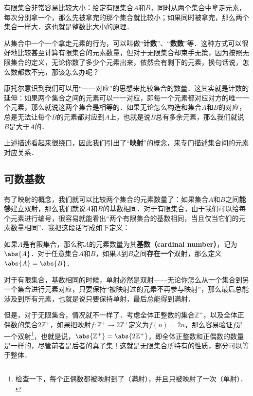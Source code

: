 有限集合非常容易比较大小：给定有限集合$A$和$B$，同时从两个集合中拿走元素，每次分别拿一个，那么先被拿完的那个集合就比较小；如果同时被拿完，那么两个集合一样大．这也就是整数比大小的原理．

从集合中一个一个拿走元素的行为，可以叫做“\textbf{计数}”、“\textbf{数数}”等．这种方式可以很好地比较甚至计算有限集合的元素数量，但对于无限集合却束手无策，因为按照无限集合的定义，无论你数了多少个元素出来，依然会有剩下的元素，换句话说，怎么数都数不完，那该怎么办呢？

康托尔意识到我们可以用“一一对应”的思想来比较集合的数量．这其实就是计数的延伸：如果两个集合之间的元素可以一一对应，即每一个元素都对应对方的唯一一个元素，那么就说这两个集合是相等的．如果无论怎么构造和集合$A$和$B$的对应，总是无法让每个$B$的元素都对应到$A$上，也就是说$B$总有多余元素，那么我们就说$B$是大于$A$的．

上述描述看起来很绕口，因此我们引出了“\textbf{映射}”的概念，来专门描述集合间的元素对应关系．



\subsection{可数基数}


有了映射的概念，我们就可以比较两个集合的元素数量了：如果集合$A$和$B$之间\textbf{能够}建立双射，那么我们就说$A$和$B$的基数相同．对于有限集合，由于我们可以给每个元素进行编号，很容易就能看出“两个有限集合的基数相同，当且仅当它们的元素数量相同”．我把这段话写成如下定义：

\begin{definition}{}
如果$A$是有限集合，那么称$A$的元素数量为其\textbf{基数（cardinal number）}，记为$\abs{A}$．对于任意集合$A$和$B$，如果$A$到$B$之间\textbf{存在一个}双射，那么定义$\abs{A}=\abs{B}$．
\end{definition}


对于有限集合，基数相同的时候，单射必然是双射——无论你怎么从一个集合到另一个集合进行元素对应，只要保持“被映射过的元素不再参与映射”，那么最后总能涉及到所有元素，也就是说只要保持单射，最后总能得到满射．

但是，对于无限集合，情况就不一样了．考虑全体正整数的集合$\mathbb{Z}^+$，以及全体正偶数的集合$2\mathbb{Z}^+$，如果把映射$f:\mathbb{Z}^+\rightarrow2\mathbb{Z}^+$定义为$f(n)=2n$，那么容易验证$f$是一个双射\footnote{检查一下，每个正偶数都被映射到了（满射），并且只被映射了一次（单射）．}，也就是说，$\abs{\mathbb{Z}^+}=\abs{2\mathbb{Z}^+}$，即全体正整数和正偶数的数量是一样的，尽管前者是后者的真子集！这就是无限集合所特有的性质，部分可以等于整体．

